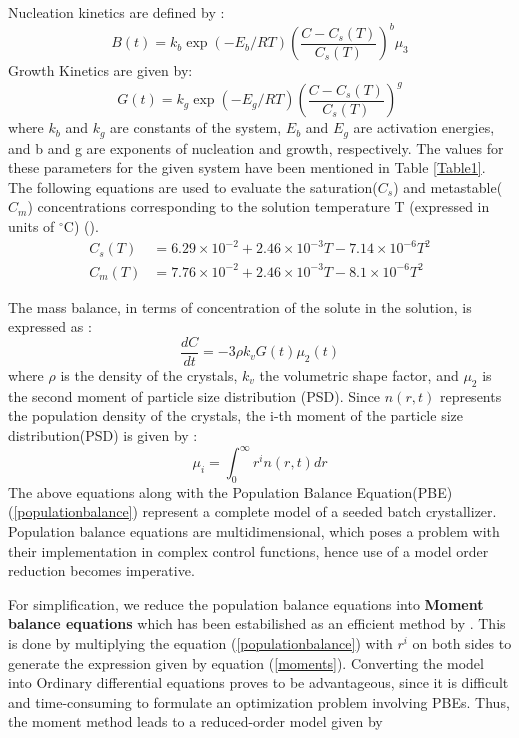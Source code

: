 \documentclass[3p,times,authoryear]{elsarticle}
\begin{document}
Nucleation kinetics are defined by :
\begin{equation}
B(t) = k_{b}\exp{\left(-E_{b}/RT \right)}\left(\frac{C - C_{s}(T)}{C_{s}(T)}\right)^{b}\mu_{3} \label{nucleation}
\end{equation}  
Growth Kinetics are given by:
\begin{equation}
G(t) = k_{g}\exp{\left(-E_{g}/RT \right)}\left(\frac{C - C_{s}(T)}{C_{s}(T)}\right)^{g} \label{growth}
\end{equation}
where $k_{b}$ and $k_{g}$ are constants of the system, $E_{b}$ and $E_{g}$ are activation energies, and b and g are exponents of nucleation and growth, respectively. The values for these parameters for the given system have been mentioned in Table \ref{Table1}. The following equations are used to evaluate the saturation($C_{s}$) and metastable($C_{m}$) concentrations corresponding to the solution temperature T (expressed in units of $^\circ$C) (\cite{shi}). \\
\begin{align}
C_{s}(T) &= 6.29\times10^{-2} + 2.46\times10^{-3}T - 7.14\times10^{-6}T^{2} \label{sat}\\
C_{m}(T) &= 7.76\times10^{-2} + 2.46\times10^{-3}T - 8.1\times10^{-6}T^{2} \label{meta}
\end{align}

 
The mass balance, in terms of concentration of the solute in the solution, is expressed as :
\begin{equation}
\frac{dC}{dt} = -3\rho{}k_{v}G(t)\mu_{2}(t)
\end{equation}
where $\rho{}$ is the density of the crystals, $k_{v}$ the volumetric shape factor, and $\mu_{2}$ is the second moment of particle size distribution (PSD).
Since $n(r,t)$ represents the population density of the crystals, the i-th moment of the particle size distribution(PSD) is given by :
\begin{equation} \label{moments}
\mu_{i} = \int_{0}^{\infty} r^{i}n(r,t) dr
\end{equation}
The above equations along with the Population Balance Equation(PBE) (\ref{populationbalance}) represent a complete model of a seeded batch crystallizer. 
Population balance equations are multidimensional, which poses a problem with their implementation in complex control functions, hence use of a model order reduction becomes imperative.\par
For simplification, we reduce the population balance equations into \textbf{Moment balance equations} which has been estabilished as an efficient method by \cite{yenkie}. This is done by multiplying the equation (\ref{populationbalance})  with $r^{i}$ on both sides to generate the expression given by equation (\ref{moments}). Converting the model into Ordinary differential equations proves to be advantageous, since it is difficult and time-consuming to formulate an optimization problem involving PBEs. Thus, the moment method leads to a reduced-order model given by 
\end{document}
